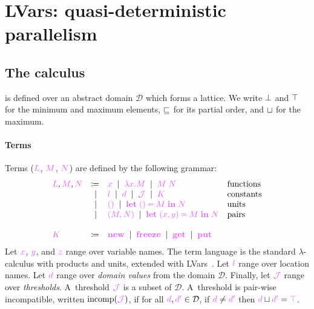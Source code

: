 \documentclass[main.tex]{subfiles}
\begin{document}
\section{LVars: quasi-deterministic parallelism}

\subsection{The \lambdalvar calculus}

\lambdalvar is defined over an abstract domain $\mathcal{D}$ which forms a lattice. We write ${\bot}$ and ${\top}$ for the minimum and maximum elements, $\mathbin{{\color{black}\sqsubseteq}}$ for its partial order, and $\mathbin{{\color{black}\sqcup}}$ for the maximum.

\paragraph*{Terms}
Terms ($\tm{L}$, $\tm{M}$, $\tm{N}$) are defined by the following grammar:
\[
  \begin{array}{lrll}
  \tm{L}, \tm{M}, \tm{N}
  & \coloneqq & \tm{x}
    \sep        \tm{\lambda x.M}
    \sep        \tm{M\;N}                     & \text{functions} \\
  & \sep      & \tm{l}
    \sep        \tm{d}
    \sep        \tmJ
    \sep        \tm{K}                        & \text{constants} \\
  & \sep      & \tm{\unit}
    \sep        \tm{\letunit{M}{N}}           & \text{units} \\
  & \sep      & \tm{\pair{M}{N}}
    \sep        \tm{\letpair{x}{y}{M}{N}}     & \text{pairs}
  \\
  \\
  \tm{K}
  & \coloneqq & \tm{\lvarnew}
    \sep        \tm{\lvarfreeze}
    \sep        \tm{\lvarget}
    \sep        \tm{\lvarput}
\end{array}
\]
Let $\tm{x}$, $\tm{y}$, and $\tm{z}$ range over variable names. The term language is the standard $\lambda$-calculus with products and units, extended with LVars~\citep{kuper15}. Let $\tm{l}$ range over location names. Let $\tm{d}$ range over \emph{domain values} from the domain $\mathcal{D}$. Finally, let $\tmJ$ range over \emph{thresholds}. A~threshold $\tmJ$ is a subset of $\mathcal{D}$. A~threshold is pair-wise incompatible, written $\incomp(\tmJ)$, if for all $\tm{d},\tm{d'}\in\mathcal{D}$, if $\tm{d}\neq\tm{d'}$ then $\tm{d}\sqcup\tm{d'}=\tm{\topD}$.
\end{document}
